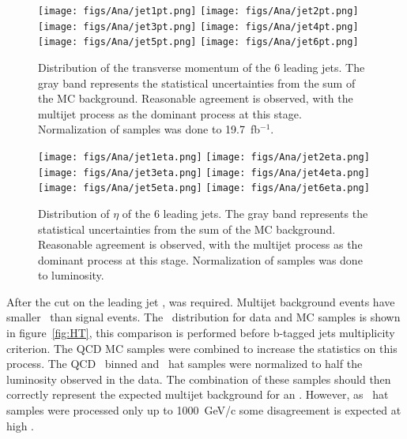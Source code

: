 \begin{figure}[!Hhtbp]
  \begin{center}
    \texttt{[image: figs/Ana/jet1pt.png]}
    \texttt{[image: figs/Ana/jet2pt.png]}
    \texttt{[image: figs/Ana/jet3pt.png]}
    \texttt{[image: figs/Ana/jet4pt.png]}
    \texttt{[image: figs/Ana/jet5pt.png]}
    \texttt{[image: figs/Ana/jet6pt.png]}
    \caption{Distribution of the transverse momentum of the 6 leading jets. The gray band represents the statistical uncertainties from the sum of the MC background. Reasonable agreement is observed, with the multijet process as the dominant process at this stage. Normalization of samples was done to 19.7~fb$^{-1}$.}
    \label{fig:6jpt}
  \end{center}
\end{figure}

\begin{figure}[!Hhtbp]
  \begin{center}
    \texttt{[image: figs/Ana/jet1eta.png]}
    \texttt{[image: figs/Ana/jet2eta.png]}
    \texttt{[image: figs/Ana/jet3eta.png]}
    \texttt{[image: figs/Ana/jet4eta.png]}
    \texttt{[image: figs/Ana/jet5eta.png]}
    \texttt{[image: figs/Ana/jet6eta.png]}
    \caption{Distribution of $\eta$ of the 6 leading jets. The gray band represents the statistical uncertainties from the sum of the MC background. Reasonable agreement is observed, with the multijet process as the dominant process at this stage. Normalization of samples was done to luminosity.}
    \label{fig:6jeta}
  \end{center}
\end{figure}

After the cut on the leading jet \pt,  was required. Multijet background events have smaller \HT~than signal events. The \HT~distribution for data and MC samples is shown in figure~\ref{fig:HT}, this comparison is performed before b-tagged jets multiplicity criterion. The QCD MC samples were combined to increase the statistics on this process. The QCD \HT~binned and \pt~hat samples were normalized to half the luminosity observed in the data. The combination of these samples should then correctly represent the expected multijet background for an . However, as \pt~hat samples were processed only up to 1000~GeV/c some disagreement is expected at high \HT.

